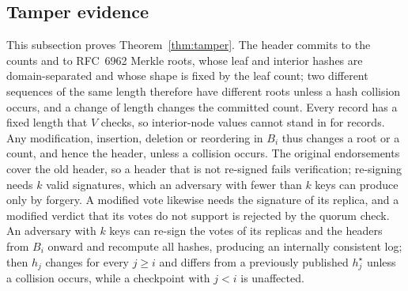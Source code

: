 \subsection{Tamper evidence}
This subsection proves Theorem~\ref{thm:tamper}.
The header commits to the counts and to RFC~6962 Merkle roots, whose
leaf and interior hashes are domain-separated and whose shape is fixed
by the leaf count; two different sequences of the same length
therefore have different roots unless a hash collision occurs, and a
change of length changes the committed count.  Every record has a fixed
length that $V$ checks, so interior-node values cannot stand in for
records.  Any modification, insertion, deletion or reordering in $B_i$
thus changes a root or a count, and hence the header, unless a
collision occurs.  The original endorsements cover the old header, so
a header that is not re-signed fails verification; re-signing needs
$k$ valid signatures, which an adversary with fewer than $k$ keys can
produce only by forgery.  A modified vote likewise needs the signature
of its replica, and a modified verdict that its votes do not support is
rejected by the quorum check.  An adversary with $k$ keys can re-sign
the votes of its replicas and the headers from $B_i$ onward and recompute
all hashes, producing an internally consistent log; then $h_j$ changes
for every $j\geq i$ and differs from a previously published
$h^{\star}_j$ unless a collision occurs, while a checkpoint with
$j<i$ is unaffected.

